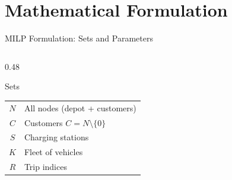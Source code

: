 \documentclass[aspectratio=169,11pt]{beamer}
\begin{document}
\section{Mathematical Formulation}

\begin{frame}{MILP Formulation: Sets and Parameters}
    \begin{columns}[T]
        \begin{column}{0.48\textwidth}
            \begin{block}{Sets}
                \begin{tabular}{cl}
                    $N$ & All nodes (depot + customers) \\
                    $C$ & Customers $C = N \setminus \{0\}$ \\
                    $S$ & Charging stations \\
                    $K$ & Fleet of vehicles \\
                    $R$ & Trip indices
                \end{tabular}
            \end{block}
            

\end{column}
\end{columns}
\end{frame}
\end{document}
